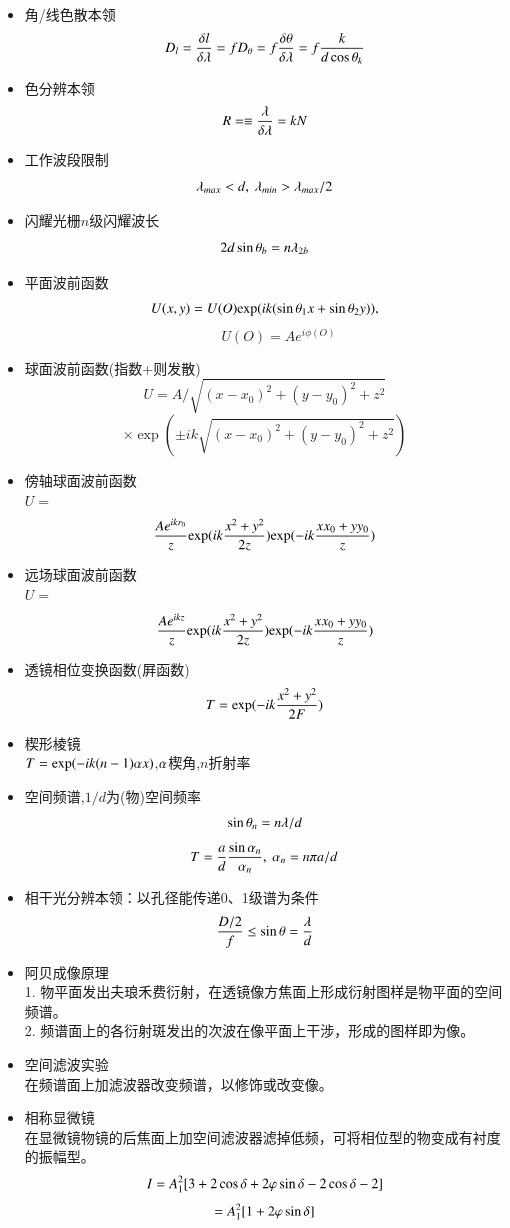 \documentclass[UTF8,8pt]{ctexart}
\begin{document}
\begin{multicols}{3}
\begin{itemize}
\item 角/线色散本领
    $$D_l=\frac{\delta l}{\delta\lambda}=fD_\theta=f\frac{\delta \theta}{\delta\lambda}=f\frac{k}{d\cos\theta_k}$$ 
\item 色分辨本领
    $$R =\equiv \frac{\lambda}{\delta\lambda}=kN$$
\item 工作波段限制
    $$\l_{max}<d,\ \l_{min}>\l_{max}/2$$
\item 闪耀光栅$n$级闪耀波长
    $$2d\sin\theta_b=n\lambda_{2b}$$
\end{itemize}
\begin{itemize}
    \item 平面波前函数
    $$U(x,y)=U(O)\mathrm{exp}(ik(\sin\theta_1 x+\sin\theta_2y)),$$
    $$\qquad U(O)=Ae^{i\phi(O)}$$
    \item 球面波前函数(指数+则发散)
    $$U=A/\sqrt{(x-x_0)^2+(y-y_0)^2+z^2}$$
    $$\times \exp(\pm ik\sqrt{(x-x_0)^2+(y-y_0)^2+z^2})$$
    \item 傍轴球面波前函数\\
        $U=$
        $$\frac{Ae^{ikr_0}}{z}\mathrm{exp}(ik\frac{x^2+y^2}{2z})\mathrm{exp}(-ik\frac{xx_0+yy_0}{z})$$
    \item 远场球面波前函数\\
        $U=$
        $$\frac{Ae^{ikz}}{z}\mathrm{exp}(ik\frac{x^2+y^2}{2z})\mathrm{exp}(-ik\frac{xx_0+yy_0}{z})$$
    \item 透镜相位变换函数(屛函数)
        $$T=\mathrm{exp}(-ik\frac{x^2+y^2}{2F})$$
    \item 楔形棱镜\\
    $T=\mathrm{exp}(-ik(n-1)\alpha x)$,$\alpha$楔角,$n$折射率
    \item 空间频谱,$1/d$为(物)空间频率
        $$\sin\theta_n=n\lambda/d$$
        $$T=\frac{a}{d}\frac{\sin\alpha_n}{\alpha_n},\ \alpha_n=n\pi a/d$$
    \item 相干光分辨本领：以孔径能传递0、1级谱为条件
        $$\frac{D/2}{f} \leq \sin\theta=\frac{\lambda}{d}$$
    \item 阿贝成像原理\\
        1. 物平面发出夫琅禾费衍射，在透镜像方焦面上形成衍射图样是物平面的空间频谱。\\
        2. 频谱面上的各衍射斑发出的次波在像平面上干涉，形成的图样即为像。
    \item 空间滤波实验\\
        在频谱面上加滤波器改变频谱，以修饰或改变像。
    \item 相称显微镜\\
        在显微镜物镜的后焦面上加空间滤波器滤掉低频，可将相位型的物变成有衬度的振幅型。
        $$I=A_1^2[3+2\cos\delta+2\varphi\sin\delta-2\cos\delta-2]$$
        $$=A_1^2[1+2\varphi\sin\delta]$$

\end{itemize}
\end{multicols}
\end{document}
